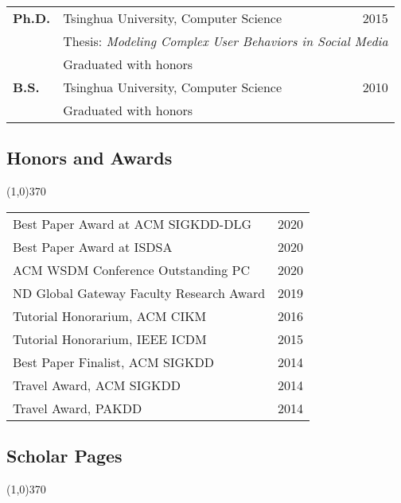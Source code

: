 \documentclass[10pt]{article}
\newcounter{list}
\begin{document}
\begin{table}[h!]
\begin{tabular*}{12.7cm}{p{1.15cm}p{10.00cm}r}
\bf{Ph.D.}&Tsinghua University, Computer Science&2015\\
 &\multicolumn{2}{l}{\small Thesis: \textit{Modeling Complex User Behaviors in Social Media}}\\
 &\multicolumn{2}{l}{\small Graduated with honors}\\	
\bf{B.S.}&Tsinghua University, Computer Science&2010\\
 &\multicolumn{2}{l}{\small Graduated with honors}\\	

\end{tabular*}
\end{table}

\vspace{-0.6cm}
\subsection{\sc Honors and Awards}
\vspace{-0.4cm} \line(1,0){370} \vspace{-0.1cm}

\begin{table}[h!]
\begin{tabular*}{12.7cm}{p{11.65cm}r}
Best Paper Award at ACM SIGKDD-DLG & 2020 \\
Best Paper Award at ISDSA & 2020 \\
ACM WSDM Conference Outstanding PC & 2020 \\
ND Global Gateway Faculty Research Award & 2019 \\
Tutorial Honorarium, ACM CIKM & 2016 \\
Tutorial Honorarium, IEEE ICDM & 2015 \\
Best Paper Finalist, ACM SIGKDD & 2014 \\
Travel Award, ACM SIGKDD & 2014 \\
Travel Award, PAKDD & 2014 \\
\end{tabular*}
\end{table}

\vspace{-0.6cm}
\subsection{\sc Scholar Pages}
\vspace{-0.4cm} \line(1,0){370} \vspace{-0.1cm}
\end{document}
